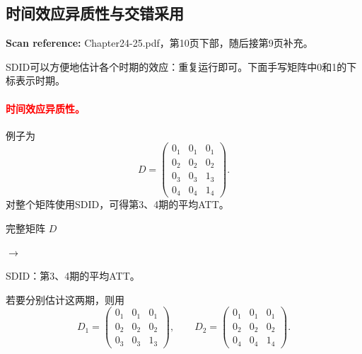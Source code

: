 \documentclass[11pt,a4paper]{article}
\newcommand{\sourcepages}[1]{\par{\small\sffamily\color{muted}\textbf{Scan reference:} #1\par}\nobreak\smallskip\nopagebreak[4]}
\newcommand{\inkred}[1]{\textcolor{red}{#1}}
\newcommand{\notearrow}[3]{%
\par\Needspace{6\baselineskip}\smallskip
\noindent\begin{minipage}[c]{0.43\linewidth}\raggedright\color{#1}#2\end{minipage}%
\hfill\textcolor{#1}{\(\longrightarrow\)}\hfill%
\begin{minipage}[c]{0.43\linewidth}\raggedright#3\end{minipage}\par\smallskip}
\begin{document}
\subsection{时间效应异质性与交错采用}
\sourcepages{Chapter24-25.pdf，第10页下部，随后接第9页补充。}
SDID可以方便地估计各个时期的效应：重复运行即可。下面手写矩阵中0和1的下标表示时期。
\paragraph{\inkred{时间效应异质性。}}
例子为
\[
D=\begin{pmatrix}
0_1&0_1&0_1\\0_2&0_2&0_2\\0_3&0_3&1_3\\0_4&0_4&1_4
\end{pmatrix}.
\]
对整个矩阵使用SDID，可得第3、4期的平均ATT。
\notearrow{black}{完整矩阵 \(D\)}{SDID：第3、4期的平均ATT。} 若要分别估计这两期，则用
\[
D_1=\begin{pmatrix}0_1&0_1&0_1\\0_2&0_2&0_2\\0_3&0_3&1_3\end{pmatrix},
\qquad
D_2=\begin{pmatrix}0_1&0_1&0_1\\0_2&0_2&0_2\\0_4&0_4&1_4\end{pmatrix}.
\]
\end{document}

